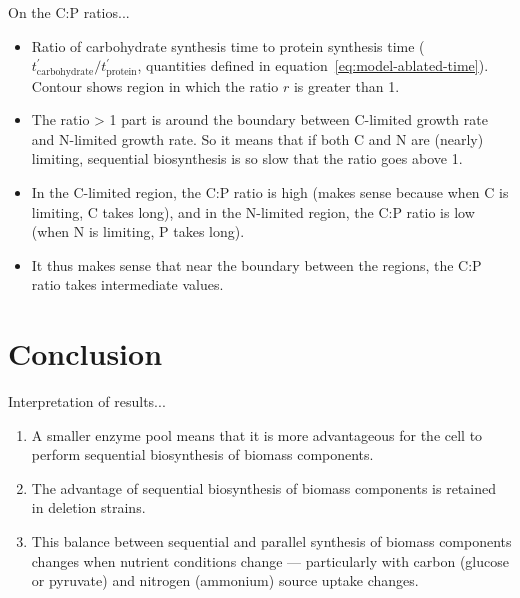 On the C:P ratios...
\begin{itemize}
  \item Ratio of carbohydrate synthesis time to protein synthesis time ($t_{\mathrm{carbohydrate}}^{\prime}/t_{\mathrm{protein}}^{\prime}$, quantities defined in equation~\ref{eq:model-ablated-time}).
        Contour shows region in which the ratio $r$ is greater than 1.
  \item The ratio > 1 part is around the boundary between C-limited growth rate and N-limited growth rate.
        So it means that if both C and N are (nearly) limiting, sequential biosynthesis is so slow that the ratio goes above 1.
  \item In the C-limited region, the C:P ratio is high (makes sense because when C is limiting, C takes long), and in the N-limited region, the C:P ratio is low (when N is limiting, P takes long).
  \item It thus makes sense that near the boundary between the regions, the C:P ratio takes intermediate values.
\end{itemize}

\section{Conclusion}
\label{subsec:model-conclusion}


Interpretation of results...
\begin{enumerate}
  \item A smaller enzyme pool means that it is more advantageous for the cell to perform sequential biosynthesis of biomass components.
  \item The advantage of sequential biosynthesis of biomass components is retained in deletion strains.
  \item This balance between sequential and parallel synthesis of biomass components changes when nutrient conditions change --- particularly with carbon (glucose or pyruvate) and nitrogen (ammonium) source uptake changes.
\end{enumerate}

